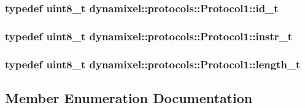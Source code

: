 \subsubsection[{\texorpdfstring{id\+\_\+t}{id_t}}]{\setlength{\rightskip}{0pt plus 5cm}typedef uint8\+\_\+t {\bf dynamixel\+::protocols\+::\+Protocol1\+::id\+\_\+t}}\hypertarget{classdynamixel_1_1protocols_1_1_protocol1_a1d4dfa22b01f80b1876d14f539d52b5c}{}\label{classdynamixel_1_1protocols_1_1_protocol1_a1d4dfa22b01f80b1876d14f539d52b5c}
\subsubsection[{\texorpdfstring{instr\+\_\+t}{instr_t}}]{\setlength{\rightskip}{0pt plus 5cm}typedef uint8\+\_\+t {\bf dynamixel\+::protocols\+::\+Protocol1\+::instr\+\_\+t}}\hypertarget{classdynamixel_1_1protocols_1_1_protocol1_a572dc8c0871ecdf3d62c4f58fbcfd454}{}\label{classdynamixel_1_1protocols_1_1_protocol1_a572dc8c0871ecdf3d62c4f58fbcfd454}
\subsubsection[{\texorpdfstring{length\+\_\+t}{length_t}}]{\setlength{\rightskip}{0pt plus 5cm}typedef uint8\+\_\+t {\bf dynamixel\+::protocols\+::\+Protocol1\+::length\+\_\+t}}\hypertarget{classdynamixel_1_1protocols_1_1_protocol1_acd6456c39a2f75de2db3d730941027cc}{}\label{classdynamixel_1_1protocols_1_1_protocol1_acd6456c39a2f75de2db3d730941027cc}


\subsection{Member Enumeration Documentation}
